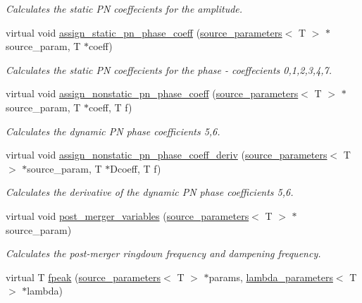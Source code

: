 \begin{DoxyCompactItemize}
\begin{DoxyCompactList}\small\item\em Calculates the static PN coeffecients for the amplitude. \end{DoxyCompactList}\item 
\mbox{\label{classIMRPhenomD_aaee6c205b4dbd79e12177656ad84744c}} 
virtual void \hyperlink{classIMRPhenomD_aaee6c205b4dbd79e12177656ad84744c}{assign\+\_\+static\+\_\+pn\+\_\+phase\+\_\+coeff} (\hyperlink{structsource__parameters}{source\+\_\+parameters}$<$ T $>$ $\ast$source\+\_\+param, T $\ast$coeff)
\begin{DoxyCompactList}\small\item\em Calculates the static PN coeffecients for the phase -\/ coeffecients 0,1,2,3,4,7. \end{DoxyCompactList}\item 
virtual void \hyperlink{classIMRPhenomD_a0fce09494daa1fee6be8297b8f18dec4}{assign\+\_\+nonstatic\+\_\+pn\+\_\+phase\+\_\+coeff} (\hyperlink{structsource__parameters}{source\+\_\+parameters}$<$ T $>$ $\ast$source\+\_\+param, T $\ast$coeff, T f)
\begin{DoxyCompactList}\small\item\em Calculates the dynamic PN phase coefficients 5,6. \end{DoxyCompactList}\item 
virtual void \hyperlink{classIMRPhenomD_aa10c5932742768573488dbdfa8526bff}{assign\+\_\+nonstatic\+\_\+pn\+\_\+phase\+\_\+coeff\+\_\+deriv} (\hyperlink{structsource__parameters}{source\+\_\+parameters}$<$ T $>$ $\ast$source\+\_\+param, T $\ast$Dcoeff, T f)
\begin{DoxyCompactList}\small\item\em Calculates the derivative of the dynamic PN phase coefficients 5,6. \end{DoxyCompactList}\item 
virtual void \hyperlink{classIMRPhenomD_a0d33a9a937a36f395300bab4276102af}{post\+\_\+merger\+\_\+variables} (\hyperlink{structsource__parameters}{source\+\_\+parameters}$<$ T $>$ $\ast$source\+\_\+param)
\begin{DoxyCompactList}\small\item\em Calculates the post-\/merger ringdown frequency and dampening frequency. \end{DoxyCompactList}\item 
virtual T \hyperlink{classIMRPhenomD_a31c4222e9a39b6eadd42c4f6707d8245}{fpeak} (\hyperlink{structsource__parameters}{source\+\_\+parameters}$<$ T $>$ $\ast$params, \hyperlink{structlambda__parameters}{lambda\+\_\+parameters}$<$ T $>$ $\ast$lambda)

\end{DoxyCompactItemize}
